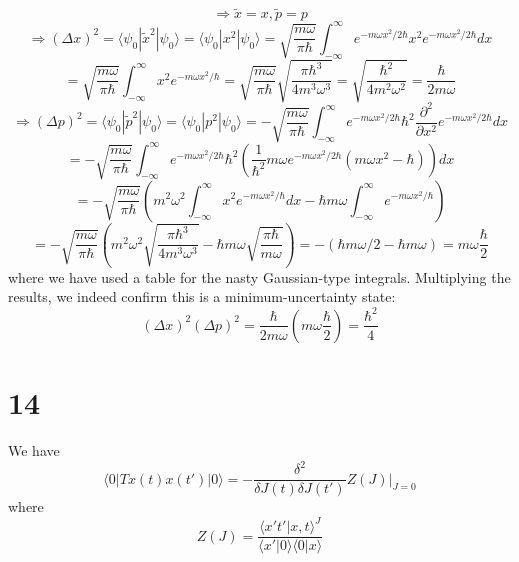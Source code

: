 \documentclass{article}
\begin{document}
\[
  \Rightarrow \tilde{x}=x, \tilde{p}=p
\]
\[
  \Rightarrow (\Delta x)^{2}=\langle \psi_{0}|\tilde{x}^{2}|\psi_{0} \rangle=\langle \psi_{0}|x^{2}|\psi_{0} \rangle
  =\sqrt{\frac{m\omega}{\pi\hbar}}\int_{-\infty}^{\infty}e^{-m\omega x^{2}/2\hbar}x^{2}e^{-m\omega x^{2}/2\hbar}dx
\]
\[
  =\sqrt{\frac{m\omega}{\pi\hbar}}\int_{-\infty}^{\infty}x^{2}e^{-m\omega x^{2}/\hbar}
  =\sqrt{\frac{m\omega}{\pi\hbar}}\sqrt{\frac{\pi\hbar^{3}}{4m^{3}\omega^{3}}}
  =\sqrt{\frac{\hbar^{2}}{4m^{2}\omega^{2}}}=\frac{\hbar}{2m\omega}
\]
\[
  \Rightarrow (\Delta p)^{2}=\langle \psi_{0}|\tilde{p}^{2}|\psi_{0} \rangle=\langle \psi_{0}|p^{2}|\psi_{0} \rangle
  =-\sqrt{\frac{m\omega}{\pi\hbar}}\int_{-\infty}^{\infty}e^{-m\omega x^{2}/2\hbar}\hbar^{2}\frac{\partial^{2}}{\partial x^{2}}
  e^{-m\omega x^{2}/2\hbar}dx
\]
\[
  =-\sqrt{\frac{m\omega}{\pi\hbar}}\int_{-\infty}^{\infty}e^{-m\omega x^{2}/2\hbar}
  \hbar^{2}\left( \frac{1}{\hbar^{2}} m\omega e^{-m\omega x^{2}/2\hbar}(m\omega x^{2}-\hbar)\right)dx
\]
\[
  =-\sqrt{\frac{m\omega}{\pi\hbar}}\left( m^{2}\omega^{2}\int_{-\infty}^{\infty}x^{2}e^{-m\omega x^{2}/\hbar}dx
    -\hbar m\omega\int_{-\infty}^{\infty}e^{-m\omega x^{2}/\hbar}\right)
\]
\[
  =-\sqrt{\frac{m\omega}{\pi\hbar}}\left( m^{2}\omega^{2}\sqrt{\frac{\pi \hbar^{3}}{4m^{3}\omega^{3}}}
    -\hbar m\omega\sqrt{\frac{\pi\hbar}{m\omega}} \right)
  =-(\hbar m\omega/2-\hbar m\omega)=m\omega\frac{\hbar}{2}
\]
where we have used a table for the nasty Gaussian-type integrals.
Multiplying the results, we indeed confirm this is a minimum-uncertainty state:
\[
  (\Delta x)^{2}(\Delta p)^{2}=\frac{\hbar}{2m\omega}\left( m\omega\frac{\hbar}{2}\right)=\frac{\hbar^{2}}{4}
\]

\section*{14}
We have
\[
  \langle 0|Tx(t)x(t')|0 \rangle=-\frac{\delta^{2}}{\delta J(t)\delta J(t')}Z(J)\bigg|_{J=0}
\]
where
\[
  Z(J)=\frac{\langle x't'|x,t \rangle^{J}}{\langle x'|0 \rangle\langle 0|x \rangle}
\]
\end{document}
